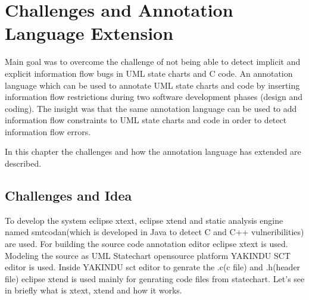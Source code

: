 \chapter{ Challenges and Annotation Language Extension}
Main goal was to overcome the challenge of not being able
to detect implicit and explicit information flow bugs in UML state charts and C code. An annotation language
which can be used to annotate UML state charts and code by inserting information flow
restrictions during two software development phases (design
and coding). The insight was that the same annotation language can be used to add information flow constraints to UML state charts and code in order to detect information flow errors.
 
In this chapter the challenges and how the annotation language has extended are described.

\section{Challenges and Idea}

To develop the system eclipse xtext, eclipse xtend and static analysis engine named smtcodan(which is developed in Java to detect C and C++ vulneribilities) are used. For building the source code annotation editor eclipse xtext is used. Modeling the source as UML Statechart opensource platform YAKINDU SCT editor is used. Inside YAKINDU sct editor to genrate the .c(c file) and .h(header file) eclipse xtend is used mainly for genrating code files from statechart. Let's see in briefly what is xtext, xtend and how it works.

